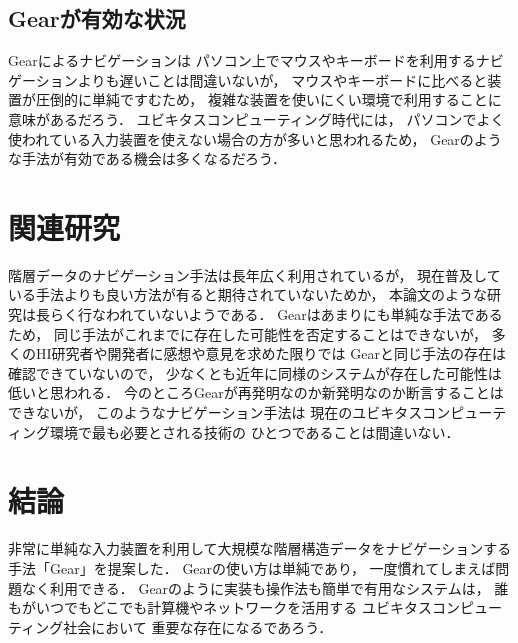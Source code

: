 \documentclass[twoside]{wiss}
\def\GEAR{\textsf{Gear}}
\begin{document}
% 

\subsection{{\GEAR}が有効な状況}

{\GEAR}によるナビゲーションは
パソコン上でマウスやキーボードを利用するナビゲーションよりも遅いことは間違いないが，
マウスやキーボードに比べると装置が圧倒的に単純ですむため，
複雑な装置を使いにくい環境で利用することに意味があるだろう．
ユビキタスコンピューティング時代には，
パソコンでよく使われている入力装置を使えない場合の方が多いと思われるため，
{\GEAR}のような手法が有効である機会は多くなるだろう．


\section{関連研究}

階層データのナビゲーション手法は長年広く利用されているが，
現在普及している手法よりも良い方法が有ると期待されていないためか，
本論文のような研究は長らく行なわれていないようである．
%
{\GEAR}はあまりにも単純な手法であるため，
同じ手法がこれまでに存在した可能性を否定することはできないが，
多くのHI研究者や開発者に感想や意見を求めた限りでは
{\GEAR}と同じ手法の存在は確認できていないので，
少なくとも近年に同様のシステムが存在した可能性は低いと思われる．
%
今のところ{\GEAR}が再発明なのか新発明なのか断言することはできないが，
このようなナビゲーション手法は
現在のユビキタスコンピューティング環境で最も必要とされる技術の
ひとつであることは間違いない．

\section{結論}

非常に単純な入力装置を利用して大規模な階層構造データをナビゲーションする
手法「{\GEAR}」を提案した．
{\GEAR}の使い方は単純であり，
一度慣れてしまえば問題なく利用できる．
%
{\GEAR}のように実装も操作法も簡単で有用なシステムは，
誰もがいつでもどこでも計算機やネットワークを活用する
ユビキタスコンピューティング社会において
重要な存在になるであろう．

{\scriptsize


}
\end{document}
